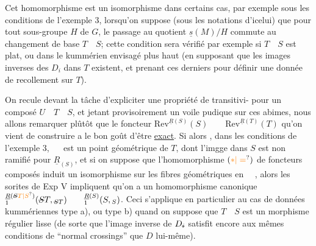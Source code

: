 
Cet homomorphisme est un isomorphisme dans certains cas, par exemple sous les conditions de l'exemple 3, lorsqu'on suppose (sous les notations d'icelui) que pour tout sous-groupe $H$ de $G$, le passage au quotient $\underline{s}(M)/H$ commute au changement de base $T\quad S$; cette condition sera vérifié
par exemple si $T\quad S$ est plat, ou dans le kummérien  envisagé plus haut (en supposant que les images inverses des $D_i$ dans $T$ existent, et prenant ces derniers pour définir une donnée de recollement sur $T$).

On recule devant la tâche d'expliciter une propriété de transitivi- pour un composé $U\quad T\quad S$, et jetant provisoirement un voile pudique sur ces abimes, nous allons remarquer plûtôt que le foncteur $\mathrm{Rev}^{\underline R(S)}(S)\qquad\mathrm{Rev}^{\underline R(T)}(T)$ qu'on vient de construire a le bon goût d'être \uline{exact}. Si alors , dans les conditions de l'exemple 3, $\quad$ est un point géométrique de $T$,  dont l'imgge dans $S$ est non ramifié pour $\underline R_{(S)}$, et si on suppose que  l'homomorphisme  $(\unsure{*|=})$ de foncteurs composés induit un isomorphisme sur les fibres géométriques en $\quad$, alors les sorites de Exp V impliquent qu'on a un homomorphisme canonique $ {}_{1}^{\underline R(\deleted{S}\unsure{T|S})}(\deleted{S}T,{}_{\deleted{S}T})\qquad{}_{1}^{\underline R(S)}(S,{}_{S})$. Ceci s'applique en particulier au cas de données kummériennes type a), ou type b)  quand on suppose que $T\quad S$ est un morphisme régulier  lisse (de sorte que l'image inverse de $D_{\deleted{i}}$ satisfit encore aux mêmes conditions de ``normal crossings'' que $D$ lui-même).


